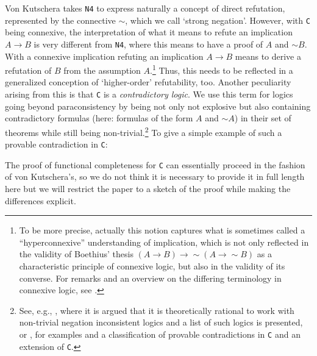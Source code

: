 \documentclass{article}%
\theoremstyle{break}
\begin{document}
Von Kutschera takes \texttt{N4} to express naturally a concept of direct refutation, represented by the connective ${\sim}$, which we call `strong negation'.
However, with \texttt{C} being connexive, the interpretation of what it means to refute an implication $A \rightarrow B$ is very different from \texttt{N4}, where this means to have a proof of $A$ and ${\sim} B$.
With a connexive implication refuting an implication $A \rightarrow B$ means to derive a refutation of $B$ from the assumption $A$.\footnote{To be more precise, actually this notion captures what is sometimes called a ``hyperconnexive'' understanding of implication, which is not only reflected in the validity of Boethius' thesis $(A\rightarrow B) \rightarrow {\sim}(A\rightarrow {\sim} B)$ as a characteristic principle of connexive logic, but also in the validity of its converse. For remarks and an overview on the differing terminology in connexive logic, see \cite{WansingOmori2024}.}
Thus, this needs to be reflected in a generalized conception of `higher-order' refutability, too.
Another peculiarity arising from this is that \texttt{C} is a \emph{contradictory logic}.
We use this term for logics going beyond paraconsistency by being not only not explosive but also containing contradictory formulas (here: formulas of the form $A$ and ${\sim} A$) in their set of theorems while still being non-trivial.\footnote{See, e.g., \cite{Wansingforthcoming}, where it is argued that it is theoretically rational to work with non-trivial negation inconsistent logics and a list of such logics is presented, or \cite{NikiWansing2023}, for examples and a classification of provable contradictions in \texttt{C} and an extension of \texttt{C}.} To give a simple example of such a provable contradiction in \texttt{C}:
\vspace{0.2cm}

\begin{center}
    
\quad
{}
\quad \quad
{}
\end{center}


The proof of functional completeness for \texttt{C} can essentially proceed in the fashion of von Kutschera's, so we do not think it is necessary to provide it in full length here but we will restrict the paper to a sketch of the proof while making the differences explicit. 
\end{document}

